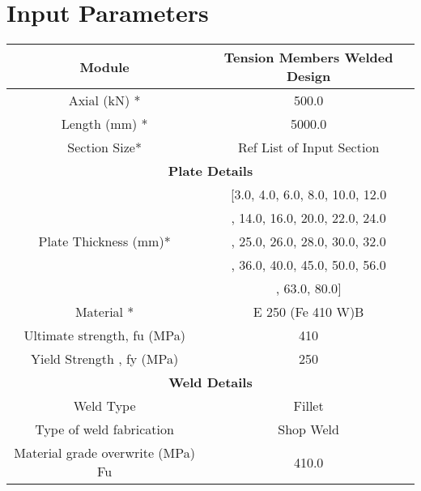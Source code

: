 \documentclass{article}%
\begin{document}
%
\normalsize%
\fontsize{8}{12}%
\selectfont%
\pagestyle{header}%
\section{Input Parameters}%
\label{sec:InputParameters}%
\renewcommand{\arraystretch}{1.2}%
\begin{longtable}{|p{5cm}|p{2cm}|p{2cm}|p{2cm}|p{5cm}|}%
\hline%
\hline%
\multicolumn{3}{|c|}{Module}&\multicolumn{2}{|c|}{Tension Members Welded Design}\\%
\hline%
\hline%
\multicolumn{3}{|c|}{Axial (kN) *}&\multicolumn{2}{|c|}{500.0}\\%
\hline%
\hline%
\multicolumn{3}{|c|}{Length (mm) *}&\multicolumn{2}{|c|}{5000.0}\\%
\hline%
\hline%
\multicolumn{3}{|c|}{Section Size*}&\multicolumn{2}{|c|}{Ref List of Input Section}\\%
\hline%
\hline%
\multicolumn{5}{|c|}{\textbf{Plate Details}}\\%
\hline%
\multicolumn{3}{|c|}{\multirow{5}{*}{Plate Thickness (mm)*}}&\multicolumn{2}{|c|}{{[}3.0, 4.0, 6.0, 8.0, 10.0, 12.0}\\%
\multicolumn{3}{|c|}{\multirow{5}{*}{}}&\multicolumn{2}{|c|}{, 14.0, 16.0, 20.0, 22.0, 24.0}\\%
\multicolumn{3}{|c|}{\multirow{5}{*}{}}&\multicolumn{2}{|c|}{, 25.0, 26.0, 28.0, 30.0, 32.0}\\%
\multicolumn{3}{|c|}{\multirow{5}{*}{}}&\multicolumn{2}{|c|}{, 36.0, 40.0, 45.0, 50.0, 56.0}\\%
\multicolumn{3}{|c|}{\multirow{5}{*}{}}&\multicolumn{2}{|c|}{, 63.0, 80.0{]}}\\%
\hline%
\hline%
\multicolumn{3}{|c|}{Material *}&\multicolumn{2}{|c|}{E 250 (Fe 410 W)B}\\%
\hline%
\hline%
\multicolumn{3}{|c|}{Ultimate strength, fu (MPa)}&\multicolumn{2}{|c|}{410}\\%
\hline%
\hline%
\multicolumn{3}{|c|}{Yield Strength , fy (MPa)}&\multicolumn{2}{|c|}{250}\\%
\hline%
\hline%
\multicolumn{5}{|c|}{\textbf{Weld Details}}\\%
\hline%
\hline%
\multicolumn{3}{|c|}{Weld Type}&\multicolumn{2}{|c|}{Fillet}\\%
\hline%
\hline%
\multicolumn{3}{|c|}{Type of weld fabrication}&\multicolumn{2}{|c|}{Shop Weld}\\%
\hline%
\hline%
\multicolumn{3}{|c|}{Material grade overwrite (MPa) Fu}&\multicolumn{2}{|c|}{410.0}\\%

\end{longtable}
\end{document}
